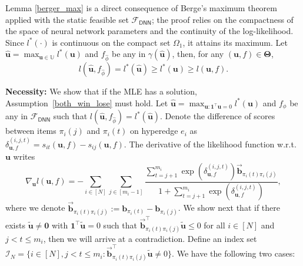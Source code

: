 \documentclass[
  12pt]{article}
\begin{document}
Lemma \ref{berger_max} is a direct consequence of Berge’s maximum theorem \citep{berge1963topological} applied with the static feasible set $\mathcal{F}_{\mathsf{DNN}}$; the proof relies on the compactness of the space of neural network parameters and the continuity of the log-likelihood. Since $l^*(\cdot)$ is continuous on the compact set $\Omega_1$, it attains its maximum. Let $\widehat{\boldsymbol{u}}=\max _{\boldsymbol{u}\in \mathbb{U}} l^*(\boldsymbol{u})$ and $f_{\widehat{\phi}}$ be any in $\gamma(\widehat{\boldsymbol{u}})$, then, for any $(\boldsymbol{u}, f) \in \boldsymbol{\Theta}$,
$$l(\widehat{\boldsymbol{u}}, f_{\widehat{\phi}})=l^*(\widehat{\boldsymbol{u}}) \geq l^*(\boldsymbol{u}) \geq l(\boldsymbol{u}, f).$$

\noindent \textbf{Necessity:}
 We show that if the MLE has a solution, Assumption~\ref{both_win_lose} must hold. Let $\widehat{\boldsymbol{u}}=\max _{\boldsymbol{u}:\mathbf{1}^{\top} \boldsymbol{u}=0} l^*(\boldsymbol{u})$ and $f_\phi$ be any in $\mathcal{F}_{\mathsf{DNN}}$ such that $l(\widehat{\boldsymbol{u}}, f_{\widehat{\phi}})=l^*(\widehat{\boldsymbol{u}})$. Denote the difference of scores between items $\pi_i(j)$ and $\pi_i(t)$ on hyperedge $e_i$ as $\delta_{\boldsymbol{u},f}^{(i, j, t)}=s_{i t}(\boldsymbol{u},f)-s_{i j}(\boldsymbol{u},f)$. The derivative of the likelihood function w.r.t. $\boldsymbol{u}$ writes
$${\nabla_{\boldsymbol{u}} l(\boldsymbol{u}, f)=-\sum_{i \in[N]} \sum_{j \in\left[m_i-1\right]} \frac{\sum_{t=j+1}^{m_i} \exp \left(\delta_{\boldsymbol{u},f}^{(i, j, t)}\right)\vec{\mathbf{b}}_{\pi_{i}(t) \pi_{i}(j)}}{1+\sum_{t=j+1}^{m_i} \exp \left(\delta_{\boldsymbol{u},f}^{(i, j, t)}\right)},}$$
\noindent 
where we denote $\vec{\mathbf{b}}_{\pi_{i}(t) \pi_{i}(j)}:=\mathbf{b}_{\pi_i(t)}-\mathbf{b}_{\pi_i(j)}$. We show next that if there exists $\widetilde{\boldsymbol{u}} \neq \mathbf{0}$ with $\mathbf{1}^{\top} \widetilde{\boldsymbol{u}}=0$ such that $\vec{\mathbf{b}}_{\pi_i(t) \pi_i(j)}^{\top} \widetilde{\boldsymbol{u}} \leq 0$ for all $i \in[N]$ and $j<t \leq m_i$, then we will arrive at a contradiction. 
Define an index set $\mathcal{I}_N = \{i \in[N],j<t \leq m_i: \vec{\mathbf{b}}_{\pi_{i}(t) \pi_{i}(j)}^{\top} \widetilde{\boldsymbol{u}} \neq 0  \}.$ We have the following two cases:
\end{document}
